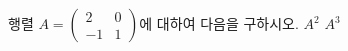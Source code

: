 \hspace*{2mm}\begin{minipage}[t]{\dimexpr\linewidth-2mm\relax}\vspace{0pt}
행렬 $A=\begin{pmatrix} 2 & 0 \\ -1 & 1 \end{pmatrix}$에 대하여 다음을 구하시오.
 $A^2$
 $A^3$\end{minipage}
